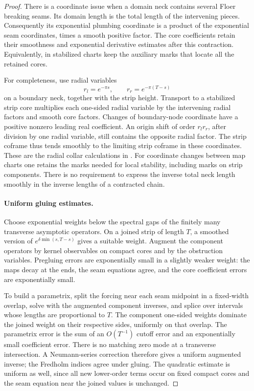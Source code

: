 \begin{proof}
There is a coordinate issue when a domain neck contains several
Floer breaking seams.  Its domain length is the total length of the
intervening pieces.  Consequently its exponential plumbing
coordinate is a product of the exponential seam coordinates, times
a smooth positive factor.  The core coefficients retain their
smoothness and exponential derivative estimates after this
contraction.  Equivalently, in stabilized charts keep the auxiliary
marks that locate all the retained cores.

For completeness, use radial variables
\[
 r_l=e^{-\pi s},\qquad r_r=e^{-\pi(T-s)}
\]
on a boundary neck, together with the strip height.  Transport to a
stabilized strip core multiplies each one-sided radial variable by
the intervening radial factors and smooth core factors.  Changes of
boundary-node coordinate have a positive nonzero leading real
coefficient.  An origin shift of order $r_lr_r$, after division by
one radial variable, still contains the opposite radial factor.
The strip coframe thus tends smoothly to the limiting strip
coframe in these coordinates.  These are the radial collar
calculations in \cite[proof of Proposition~7.5]{A8}.
For coordinate changes between map charts one retains the marks
needed for local stability, including marks on strip components.
There is no requirement to express the inverse total neck length
smoothly in the inverse lengths of a contracted chain.

\paragraph{Uniform gluing estimates.}
Choose exponential weights below the spectral gaps of the finitely
many transverse asymptotic operators.  On a joined strip of length
$T$, a smoothed version of
$e^{\delta\min(s,T-s)}$ gives a suitable weight.  Augment the
component operators by kernel observables on compact cores and by
the obstruction variables.  Pregluing errors are exponentially
small in a slightly weaker weight: the maps decay at the ends, the
seam equations agree, and the core coefficient errors are
exponentially small.

To build a parametrix, split the forcing near each seam midpoint in
a fixed-width overlap, solve with the augmented component inverses,
and splice over intervals whose lengths are proportional to $T$.
The component one-sided weights dominate the joined weight on their
respective sides, uniformly on that overlap.  The parametrix error
is the sum of an $O(T^{-1})$ cutoff error and an exponentially small
coefficient error.  There is no matching zero mode at a transverse
intersection.  A Neumann-series correction therefore gives a
uniform augmented inverse; the Fredholm indices agree under
gluing.  The quadratic estimate is uniform as well, since all new
lower-order terms occur on fixed compact cores and the seam
equation near the joined values is unchanged.


\end{proof}
